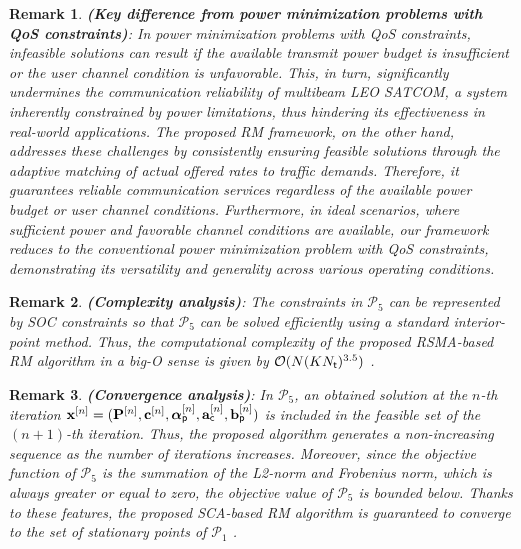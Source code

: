 \documentclass[draftclsnofoot, onecolumn, comsoc, 12pt]{IEEEtran}
\newtheorem{remark}{Remark}
\begin{document}
\begin{remark} 
{\rm \textbf{(Key difference from power minimization problems with QoS constraints)}: 
{In power minimization problems with QoS constraints, infeasible solutions can result if the available transmit power budget is insufficient or the user channel condition is unfavorable. This, in turn, significantly undermines the communication reliability of multibeam LEO SATCOM, a system inherently constrained by power limitations, thus hindering its effectiveness in real-world applications.
The proposed RM framework, on the other hand, addresses these challenges by consistently ensuring feasible solutions through the adaptive matching of actual offered rates to traffic demands. Therefore, it guarantees reliable communication services regardless of the available power budget or user channel conditions. 
Furthermore, in ideal scenarios, where sufficient power and favorable channel conditions are available, our framework reduces to the conventional power minimization problem with QoS constraints, demonstrating its versatility and generality across various operating conditions.}}
\end{remark}

\begin{remark}
{\rm\textbf{(Complexity analysis)}: The constraints in $\mathscr{P}_{5}$ can be represented by SOC constraints so that $\mathscr{P}_{5}$ can be solved efficiently using a standard interior-point method. Thus, the computational complexity of the proposed RSMA-based RM algorithm in a big-O sense is given by $\mathcal{O}( N ( K N_{{\sf{t}}} )^{3.5})$ \cite{ye2011interior}.}
\end{remark}

\begin{remark}
{\rm\textbf{(Convergence analysis)}: In $\mathscr{P}_{5}$, an obtained solution at the $n$-th iteration $\mathbf{x}^{[n]}=(\mathbf{P}^{[n]}, \mathbf{c}^{[n]}, \boldsymbol{\alpha}_{{\sf{p}}}^{[n]}, \mathbf{a}_{{\sf{c}}}^{[n]}, \mathbf{b}_{{\sf{p}}}^{[n]})$ is included in the feasible set of the $(n+1)$-th iteration. Thus, the proposed algorithm generates a non-increasing sequence as the number of iterations increases. Moreover, since the objective function of $\mathscr{P}_{5}$ is the summation of the L2-norm and Frobenius norm, which is always greater or equal to zero, the objective value of $\mathscr{P}_{5}$ is bounded below. {Thanks to these features, the proposed SCA-based RM algorithm is guaranteed to converge to the set of stationary points of $\mathscr{P}_1$ \cite{marks1978general}.}}


\end{remark}
\end{document}
